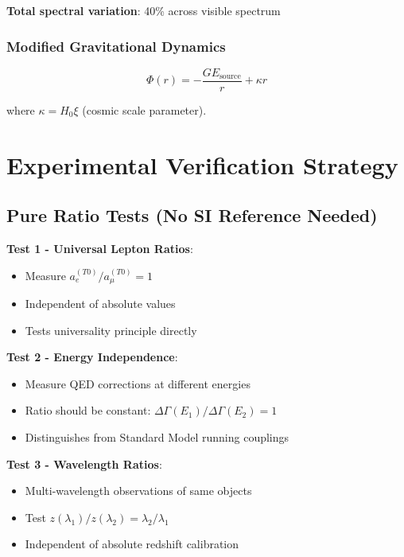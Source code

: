 \documentclass[12pt,a4paper]{article}
\newcommand{\Efield}{E}
\newcommand{\xipar}{\xi}
\theoremstyle{definition}
\theoremstyle{remark}
\begin{document}
	\textbf{Total spectral variation}: 40\% across visible spectrum
	
	\subsubsection{Modified Gravitational Dynamics}
	
	\begin{equation}
		\Phi(r) = -\frac{G\Efield_{\text{source}}}{r} + \kappa r
		\label{eq:quantitative_gravity}
	\end{equation}
	
	where $\kappa = H_0 \xipar$ (cosmic scale parameter).
	
	\section{Experimental Verification Strategy}
	
	\subsection{Pure Ratio Tests (No SI Reference Needed)}
	
	\textbf{Test 1 - Universal Lepton Ratios}:
	\begin{itemize}
		\item Measure $a_e^{(T0)}/a_{\mu}^{(T0)} = 1$
		\item Independent of absolute values
		\item Tests universality principle directly
	\end{itemize}
	
	\textbf{Test 2 - Energy Independence}:
	\begin{itemize}
		\item Measure QED corrections at different energies
		\item Ratio should be constant: $\Delta\Gamma(E_1)/\Delta\Gamma(E_2) = 1$
		\item Distinguishes from Standard Model running couplings
	\end{itemize}
	
	\textbf{Test 3 - Wavelength Ratios}:
	\begin{itemize}
		\item Multi-wavelength observations of same objects
		\item Test $z(\lambda_1)/z(\lambda_2) = \lambda_2/\lambda_1$
		\item Independent of absolute redshift calibration
	\end{itemize}
	
\end{document}
